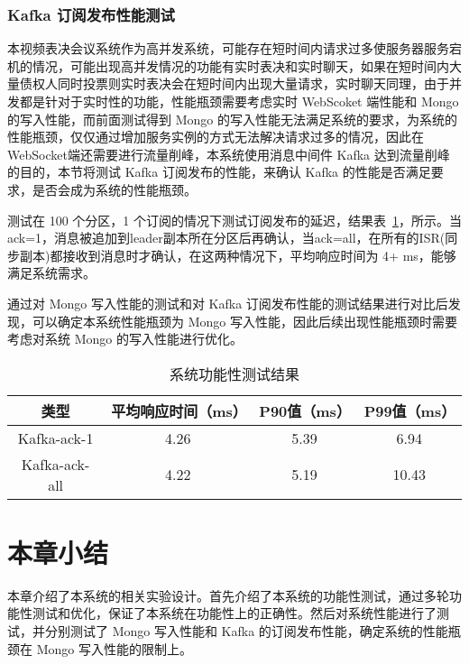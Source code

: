   \subsubsection{Kafka 订阅发布性能测试}
  本视频表决会议系统作为高并发系统，可能存在短时间内请求过多使服务器服务宕机的情况，可能出现高并发情况的功能有实时表决和实时聊天，如果在短时间内大量债权人同时投票则实时表决会在短时间内出现大量请求，实时聊天同理，由于并发都是针对于实时性的功能，性能瓶颈需要考虑实时 WebScoket 端性能和 Mongo 的写入性能，而前面测试得到 Mongo 的写入性能无法满足系统的要求，为系统的性能瓶颈，仅仅通过增加服务实例的方式无法解决请求过多的情况，因此在 WebSocket端还需要进行流量削峰，本系统使用消息中间件 Kafka 达到流量削峰的目的，本节将测试 Kafka 订阅发布的性能，来确认 Kafka 的性能是否满足要求，是否会成为系统的性能瓶颈。

  测试在 100 个分区，1 个订阅的情况下测试订阅发布的延迟，结果表~\ref{fig:test6}，所示。当ack=1，消息被追加到leader副本所在分区后再确认，当ack=all，在所有的ISR(同步副本)都接收到消息时才确认，在这两种情况下，平均响应时间为 4+ ms，能够满足系统需求。

  通过对 Mongo 写入性能的测试和对 Kafka 订阅发布性能的测试结果进行对比后发现，可以确定本系统性能瓶颈为 Mongo 写入性能，因此后续出现性能瓶颈时需要考虑对系统 Mongo 的写入性能进行优化。

  \begin{table}[h!]
    \begin{center}
      \caption{系统功能性测试结果}
      \label{fig:test6}
      \begin{tabular}{ c c c c }
        \hline
        \textbf{类型} & \textbf{平均响应时间（ms）
        } & \textbf{P90值（ms）
        } & \textbf{P99值（ms）
        } \\
        \hline
        Kafka-ack-1 & 4.26 & 5.39 & 6.94 \\
        Kafka-ack-all & 4.22 & 5.19 & 10.43 \\
        \hline
      \end{tabular}
    \end{center}
  \end{table}

  \section{本章小结}
  本章介绍了本系统的相关实验设计。首先介绍了本系统的功能性测试，通过多轮功能性测试和优化，保证了本系统在功能性上的正确性。然后对系统性能进行了测试，并分别测试了 Mongo 写入性能和 Kafka 的订阅发布性能，确定系统的性能瓶颈在 Mongo 写入性能的限制上。